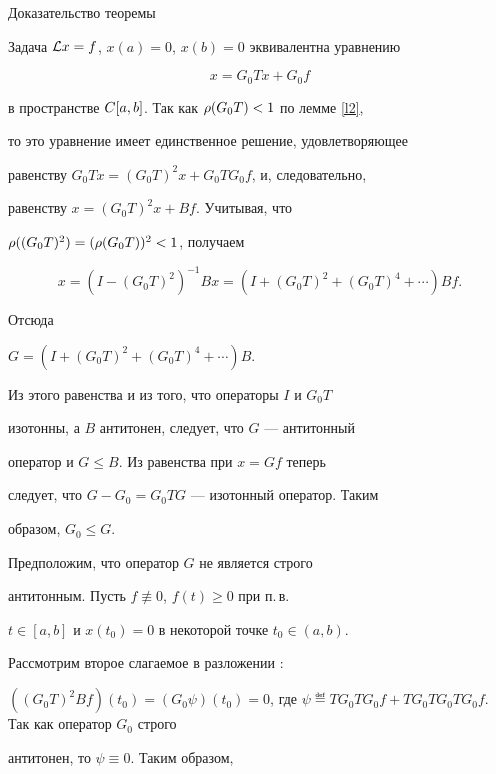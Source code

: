 \begin{pf*}{Доказательство теоремы \protect{\ref{t1}}}


Задача ${\cal L} x=f$, $x(a)=0$, $x(b)=0$ эквивалентна уравнению


\begin{equation}\label{zc}


x=G_0Tx+G_0f


\end{equation}


в пространстве $C[a,b]$. Так как $\rho(G_0T)<1$ по лемме \ref{l2},


то это уравнение имеет единственное решение, удовлетворяющее


равенству $G_0Tx=(G_0T)^2x+G_0TG_0f$, и, следовательно,


равенству $x=(G_0T)^2x+Bf$. Учитывая, что


$\rho((G_0T)^2)=(\rho(G_0T))^2<1$, получаем


\begin{equation}\label{ex}


x=(I-(G_0T)^2)^{-1}Bx=(I+(G_0T)^2+(G_0T)^4+\dotsb)Bf.


\end{equation}


Отсюда


$G=(I+(G_0T)^2+(G_0T)^4+\dotsb)B$.


Из этого равенства и из того, что операторы $I$ и $G_0T$


изотонны, а $B$ антитонен, следует, что  $G$ --- антитонный


оператор и $G\le B$. Из равенства  при $x=Gf$ теперь


следует, что $G-G_0=G_0TG$ --- изотонный оператор. Таким


образом, $G_0\le G$.





Предположим, что оператор $G$ не является строго


антитонным. Пусть $f\not\equiv0$, $f(t)\ge0$ при п.\,в.


$t\in[a,b]$ и $x(t_0)=0$ в некоторой точке $t_0\in(a,b)$.


Рассмотрим второе слагаемое в разложении :


$((G_0T)^2Bf)(t_0)=(G_0\psi)(t_0)=0$, где $\psi\eqdef


TG_0TG_0f+TG_0TG_0TG_0f$.  Так как оператор $G_0$ строго


антитонен, то $\psi\equiv0$.  Таким образом,



\end{pf*}

